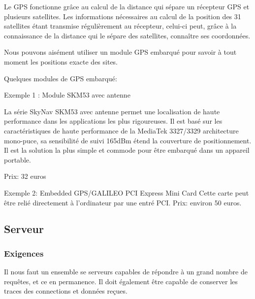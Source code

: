 Le GPS fonctionne grâce au calcul de la distance qui sépare un récepteur GPS et plusieurs satellites. Les informations nécessaires au calcul de la position des 31 satellites étant transmise régulièrement au récepteur, celui-ci peut, grâce à la connaissance de la distance qui le sépare des satellites, connaître ses coordonnées.

Nous pouvons aisément utiliser un module GPS embarqué pour savoir à tout moment les positions exacte des sites.

Quelques modules de GPS embarqué:
\begin{description}
\item Exemple 1 : Module SKM53 avec antenne

\begin{figure}
\begin{center}


\end{center}
\end{figure}

La série SkyNav SKM53 avec antenne permet une localisation de haute performance dans les applications les plus rigoureuses.
Il est basé sur les caractéristiques de haute performance de la MediaTek 3327/3329 architecture mono-puce, sa sensibilité de suivi 165dBm étend la couverture de positionnement. Il est la solution la plus simple et commode pour être embarqué dans un appareil portable.

Prix: 32 euros

\item Exemple 2: Embedded GPS/GALILEO PCI Express Mini Card
Cette carte peut être relié directement à l'ordinateur par une entré PCI.
Prix: environ 50 euros.
\end{description}
\subsection{Serveur}

    \subsubsection{Exigences}
    Il nous faut un ensemble se serveurs capables de répondre à un grand
    nombre de requêtes, et ce en permanence. Il doit également être capable
    de conserver les traces des connections et données reçues.

